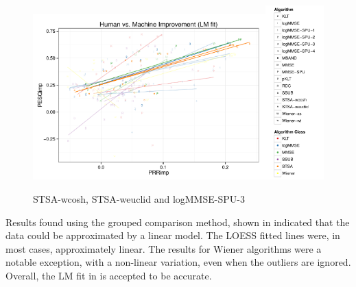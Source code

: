 \begin{figure}[h]
\noindent \begin{centering}
\includegraphics[width=0.8\textwidth]{fig/R/dir/MMSE-SPU-STSA-wcosh-STSA-weuclid-logMMSE-SPU-3/HumanMachineAllLM}\includegraphics[width=0.2\textwidth]{fig/R/dir/HumanMachineAllLegend}
\par\end{centering}

\protect\caption{\label{fig:direct-highcorr}\acs{STSA-wcosh}, \acs{STSA-weuclid}
and \acs{logMMSE-SPU-3}}
\end{figure}


Results found using the grouped comparison method, shown in 
indicated that the data could be approximated by a linear model. The
\ac{LOESS} fitted lines were, in most cases, approximately linear.
The results for Wiener algorithms were a notable exception, with a
non-linear variation, even when the outliers are ignored. Overall,
the \ac{LM} fit in  is accepted to be
accurate.

